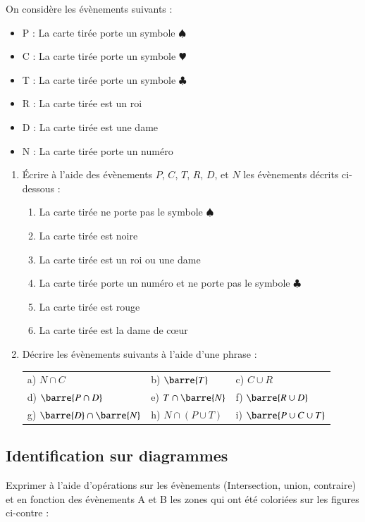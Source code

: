 \documentclass[oneside,12pt]{article}          %
\begin{document}
On considère les évènements suivants :
\begin{itemize}[label=$\bullet$]
    \item P : \og La carte tirée porte un symbole $\spadesuit$ \fg
    \item C : \og La carte tirée porte un symbole \textcolor{newred}{\large $\varheartsuit$} \fg
    \item T : \og La carte tirée porte un symbole $\clubsuit$ \fg
    \item R : \og La carte tirée est un roi \fg
    \item D : \og La carte tirée est une dame \fg
    \item N : \og La carte tirée porte un numéro \fg
\end{itemize} \vspace{-2mm}
\begin{enumerate}
    \item Écrire à l'aide des évènements $P$, $C$, $T$, $R$, $D$, et $N$ les évènements décrits ci-dessous :
    \begin{enumerate}
        \item \og La carte tirée ne porte pas le symbole $\spadesuit$ \fg
        \item \og La carte tirée est noire \fg
        \item \og La carte tirée est un roi ou une dame \fg
        \item \og La carte tirée porte un numéro et ne porte pas le symbole $\clubsuit$ \fg
        \item \og La carte tirée est rouge \fg
        \item \og La carte tirée est la dame de cœur \fg
    \end{enumerate}
\item Décrire les évènements suivants à l'aide d'une phrase : \\
    \renewcommand{\arraystretch}{1.25}
    \begin{tabular}{p{} p{} p{}}
         a) $N\cap C$ & b) $\barre{T}$ & c) $C\cup R $ \\
         d) $\barre{P\cap D}$ & e) $T\cap\barre{N}$ & f) $\barre{R\cup D}$ \\
         g) $\barre{D}\cap\barre{N}$ & h) $N \cap (P \cup T)$ & i) $\barre{P\cup C\cup T}$ 
    \end{tabular}
\end{enumerate}



\subsection{Identification sur diagrammes}
Exprimer à l'aide d'opérations sur les évènements (Intersection, union, contraire) et en fonction des évènements A et B les zones qui ont été coloriées sur les figures ci-contre :
\end{document}
